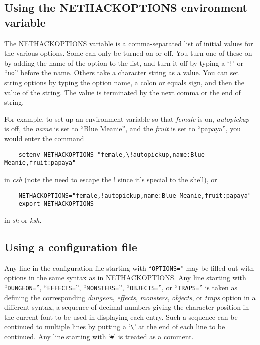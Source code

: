 \subsection*{Using the NETHACKOPTIONS environment variable}

The NETHACKOPTIONS variable is a comma-separated list of initial
values for the various options.  Some can only be turned on or off.
You turn one of these on by adding the name of the option to the list,
and turn it off by typing a `{\tt !}' or ``{\tt no}'' before the name.
Others take a
character string as a value.  You can set string options by typing
the option name, a colon or equals sign, and then the value of the string.
The value is terminated by the next comma or the end of string.

For example, to set up an environment variable so that {\it female\/}
is on, {\it autopickup\/} is off, the {\it name\/} is set to ``Blue Meanie'',
and the {\it fruit\/} is set to ``papaya'', you would enter the command
\begin{verbatim}
    setenv NETHACKOPTIONS "female,\!autopickup,name:Blue Meanie,fruit:papaya"
\end{verbatim}

\nd in {\it csh}
(note the need to escape the ! since it's special to the shell), or
\begin{verbatim}
    NETHACKOPTIONS="female,!autopickup,name:Blue Meanie,fruit:papaya"
    export NETHACKOPTIONS
\end{verbatim}

\nd in {\it sh\/} or {\it ksh}.

\subsection*{Using a configuration file}

Any line in the configuration file starting with ``{\tt OPTIONS=}'' may be
filled out with options in the same syntax as in NETHACKOPTIONS.
Any line starting with ``{\tt DUNGEON=}'', ``{\tt EFFECTS=}'',
``{\tt MONSTERS=}'', ``{\tt OBJECTS=}'', or ``{\tt TRAPS=}''
is taken as defining the corresponding {\it dungeon},
{\it effects}, {\it monsters}, {\it objects}, or
{\it traps\/} option in a different syntax,
a sequence of decimal numbers giving the character position
in the current font to be used in displaying each entry.
Such a sequence can be continued to multiple lines by putting a
`{\tt \verb+\+}' at the end of each line to be continued.
Any line starting with `{\tt \#}' is treated as a comment.

